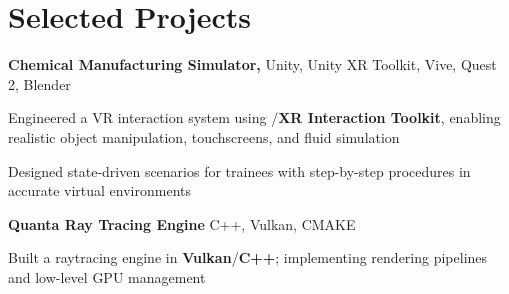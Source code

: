 
\newenvironment{twocolentry_proj}[2][]{
    \onecolentry
    \def\secondColumn{#2}
    \setcolumnwidth{\fill, 9 cm}
    \begin{paracol}{2}
}{
    \switchcolumn \raggedleft \secondColumn
    \end{paracol}
    \endonecolentry
} %

\vspace{5 pt - 0.3 cm}
\section{Selected Projects}
\begin{onecolentry}
\textbf{Chemical Manufacturing Simulator,} Unity, Unity XR Toolkit, Vive, Quest 2, Blender 
\end{onecolentry}

\vspace{0.10 cm}
\begin{onecolentry}
    \begin{highlights}
        \item Engineered a VR interaction system using /\textbf{XR Interaction Toolkit}, enabling realistic object manipulation, touchscreens, and fluid simulation
        \item Designed state-driven scenarios for trainees with step-by-step procedures in accurate virtual environments
    \end{highlights}
\end{onecolentry}   

\vspace{0.10 cm}
\begin{twocolentry_proj}{
    \mbox{}%
}
\fontsize{11 pt}{11 pt}\textbf{Quanta Ray Tracing Engine} C++, Vulkan, CMAKE
\end{twocolentry_proj}
\begin{onecolentry}
    \begin{highlights}
        \item Built a raytracing engine in \textbf{Vulkan}/\textbf{C++}; implementing rendering pipelines and low-level GPU management
    \end{highlights}
\end{onecolentry}
